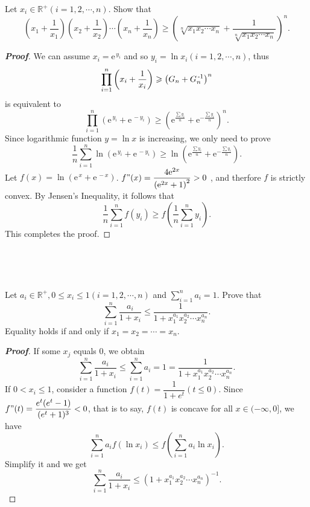 \documentclass{memoir}
\begin{document}
\begin{example}
	Let $ x_i\in \mathbb{R^{+}} (i=1,2,\cdots,n)$. Show that
	\[
	\left(x_1+\dfrac{1}{x_1}\right)\left(x_2+\dfrac{1}{x_2}\right)\cdots\left(x_n+\dfrac{1}{x_n}\right)\geqslant\left(\sqrt[n]{x_1x_2\cdots x_n} + \dfrac{1}{\sqrt[n]{x_1x_2\cdots x_n}}\right)^n.\]
\end{example}
\begin{proof}[\textbf{Proof}]
	We can assume $ x_i=\text{e}^{\, y_i} $ and so $ y_i=\ln x_i (i=1,2,\cdots,n) $, thus
	\[
	\prod_{i=1}^{n}\left(x_i+\dfrac{1}{x_i}\right)\geqslant \left(G_n+G_n^{\,\textnormal{-}1}\right)^n
	\]
	is equivalent to
	\[
	\prod_{i=1}^{n}\left(\text{e}^{\, y_i}+\text{e}^{\, -y_i}\right)\geqslant \left(\text{e}^{\tfrac{\sum y_i}{n}} +\text{e}^{-\tfrac{\sum y_i}{n}}\right)^n.
	\]
	Since logarithmic function $ y=\ln x $ is increasing, we only need to prove
	\[
	\dfrac{1}{n}\sum\limits_{i=1}^{n}\ln\left(\text{e}^{\, y_i}+\text{e}^{\, -y_i}\right)\geqslant \ln\left(\text{e}^{\tfrac{\sum y_i}{n}} +\text{e}^{-\tfrac{\sum y_i}{n}}\right).
	\]
	Let $f(x)=\ln\left(\text{e}^{\,x}+\text{e}^{\,-x}\right)$. $f"(x)=\dfrac{4\text{e}^{2x}}{\left(\text{e}^{2x}+1\right)^2}> 0$ , and therfore $f$ is strictly convex. By Jensen's Inequality, it follows that 
	\[
	\frac{1}{n}\sum_{i=1}^{n} f\left(y_i\right) \geqslant f\left(\frac{1}{n}\sum_{i=1}^{n}y_i\right).
	\] 
	This completes the proof.
	
\end{proof}	
\par \ \par \ 


\begin{example}
	Let $ a_i \in \mathbb{R^{+}},0\leqslant x_i \leqslant 1(i=1,2,\cdots ,n) $ and $ \sum\limits_{i=1}^{n}a_i=1 $. Prove that	
	\[
	\sum_{i=1}^{n}\dfrac{a_i}{1+x_i}\leqslant\dfrac{1}{1+x_{1}^{a_{1}}x_{2}^{a_{2}}\cdots x_{n}^{a_{n}}}.
	\]
	Equality holds if and only if $x_1=x_2=\cdots=x_n$.	
\end{example}
\begin{proof}[\textbf{Proof}]
	If some $ x_j $ equals $ 0 $, we obtain
	\[
	\sum_{i=1}^{n}\dfrac{a_i}{1+x_i}\leqslant\sum\limits_{i=1}^{n}a_i=1=\dfrac{1}{1+x_{1}^{a_{1}}x_{2}^{a_{2}}\cdots x_{n}^{a_{n}}}.
	\]
	If $0< x_i \leqslant 1$, consider a function $f(t)=\dfrac{1}{1+e^{t}}(t\leqslant0).$
	Since $f"(t)=\dfrac{e^{t}(e^{t}-1)}{(e^t+1)^3}<0$, that is to say, $ f(t) $ is concave for all $ x\in (-\infty,0] $, we have
	\[
	\sum_{i=1}^{n}a_if(\ln x_i)\leqslant f\left(\sum_{i=1}^{n}a_i\ln x_i\right).
	\]
	Simplify it and we get
	\[
	\sum_{i=1}^{n}\dfrac{a_i}{1+x_i}\leqslant(1+x_{1}^{a_{1}}x_{2}^{a_{2}}\cdots x_{n}^{a_{n}})^{-1}.
	\]		
\end{proof}	
\par \ 	\par \ 
			
\end{document}
